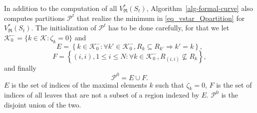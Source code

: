 \documentclass[
  11pt,
  a4paper,
]{article}
\theoremstyle{plain}
\theoremstyle{definition}
\theoremstyle{plain}
\theoremstyle{definition}
\theoremstyle{plain}
\theoremstyle{remark}
\begin{document}
In addition to the computation of all \(V^*_{\mathfrak{R}}(S_t)\),
 Algorithm~\ref{alg-formal-curve}  also computes partitions
\(\mathcal{P}^t\) that realize the minimum in
\eqref{eq_vstar_Qpartition} for \(V^*_{\mathfrak{R}}(S_t)\). The
initialization of \(\mathcal{P}^t\) has to be done carefully, for that
we let \(\mathcal{K}_0^-=\{k\in\mathcal{K}: \zeta_k=0  \}\) and
\begin{equation}
E=\left\{k\in\mathcal{K}_0^-:\forall k'\in \mathcal{K}_0^-, R_k\subseteq R_{k'}\Rightarrow k'=k \right\},
\label{E}
\end{equation} \begin{equation}
F=\left\{(i,i), 1\leq i\leq N:\forall k\in \mathcal{K}_0^-, R_{(i,i)}\not\subseteq R_k  \right\},
\label{F}
\end{equation} and finally \begin{equation}
\mathcal{P}^0=E\cup F.
\label{cP0}
\end{equation} \(E\) is the set of indices of the maximal elements \(k\)
such that \(\zeta_k=0\), \(F\) is the set of indices of all leaves that
are not a subset of a region indexed by \(E\). \(\mathcal{P}^0\) is the
disjoint union of the two.
\end{document}
